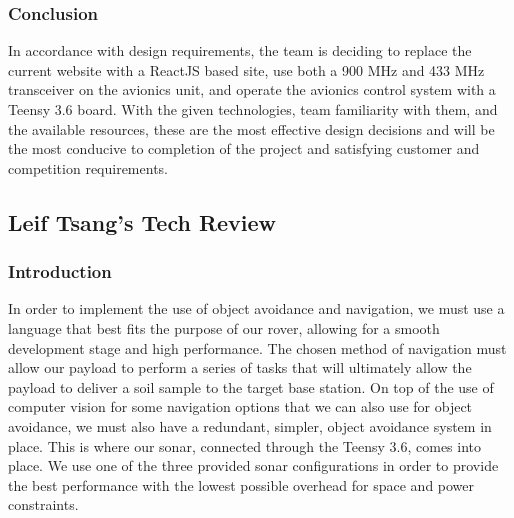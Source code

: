 \documentclass[onecolumn, draftclsnofoot, 10pt, compsoc]{IEEEtran}
\begin{document}
\subsubsection{Conclusion}
In accordance with design requirements, the team is deciding to replace the current website with a ReactJS based site, use both a 900 MHz and 433 MHz transceiver on the avionics unit, and operate the avionics control system with a Teensy 3.6 board. With the given technologies, team familiarity with them, and the available resources, these are the most effective design decisions and will be the most conducive to completion of the project and satisfying customer and competition requirements.

\subsection{Leif Tsang's Tech Review}
\subsubsection{Introduction}
In order to implement the use of object avoidance and navigation, we must use a language that best fits the purpose of our rover, allowing for a smooth development stage and high performance. The chosen method of navigation must allow our payload to perform a series of tasks that will ultimately allow the payload to deliver a soil sample to the target base station. On top of the use of computer vision for some navigation options that we can also use for object avoidance, we must also have a redundant, simpler, object avoidance system in place. This is where our sonar, connected through the Teensy 3.6, comes into place. We use one of the three provided sonar configurations in order to provide the best performance with the lowest possible overhead for space and power constraints. 
\end{document}
